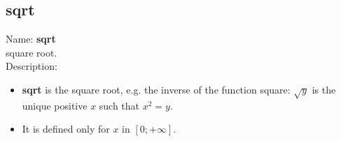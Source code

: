 \subsection{sqrt}
\label{labsqrt}
\noindent Name: \textbf{sqrt}\\
square root.\\
\noindent Description: \begin{itemize}

\item \textbf{sqrt} is the square root, e.g. the inverse of the function square: $\sqrt{y}$
   is the unique positive $x$ such that $x^2=y$.

\item It is defined only for $x$ in $[0;+\infty]$.
\end{itemize}
